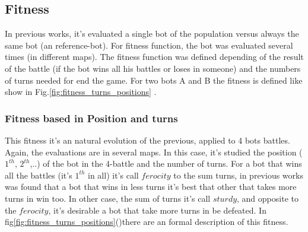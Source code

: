 \documentclass{llncs}
\begin{document}
\subsection{Fitness}

In previous works, it's evaluated a single bot of the population versus always the same bot (an reference-bot). For fitness function, the bot was evaluated several times (in different maps). The fitness function was defined depending of the result of the battle (if the bot wins all his battles or loses in someone) and the numbers of turns needed for end the game. For two bots A and B the fitness is defined like show in Fig.\ref{fig:fitness_turns_positions} . 


\subsubsection{Fitness based in Position and turns}

This fitness it's an natural evolution of the previous, applied to 4 bots battles. Again, the evaluations are in several maps. In this case, it's studied the position ($1^{th}$, $2^{th}$,..) of the bot in the 4-battle and the number of turns. For a bot that wins all the battles (it's $1^{th}$ in all) it's call {$ferocity$} to the sum turns, in previous works was found that a bot that wins in less turns it's best that other that takes more turns in win too. In other case, the sum of turns it's call {$sturdy$}, and opposite to the {$ferocity$}, it's desirable a bot that take more turns in be defeated. In fig\ref{fig:fitness_turns_positions}()there are an formal description of this fitness.
\end{document}
